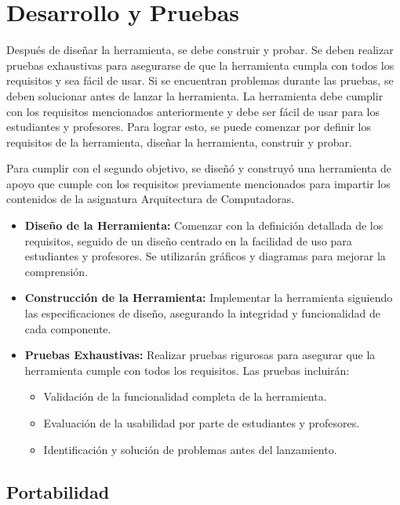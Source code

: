 \documentclass[12pt,twoside]{templates/unerthesis}
\providecommand{\tightlist}{%
  \setlength{\itemsep}{0pt}\setlength{\parskip}{0pt}}
\begin{document}
\hypertarget{desarrollo-y-pruebas}{%
\section{Desarrollo y Pruebas}\label{desarrollo-y-pruebas}}

Después de diseñar la herramienta, se debe construir y probar. Se deben realizar pruebas exhaustivas para asegurarse de que la herramienta cumpla con todos los requisitos y sea fácil de usar. Si se encuentran problemas durante las pruebas, se deben solucionar antes de lanzar la herramienta.
La herramienta debe cumplir con los requisitos mencionados anteriormente y debe ser fácil de usar para los estudiantes y profesores. Para lograr esto, se puede comenzar por definir los requisitos de la herramienta, diseñar la herramienta, construir y probar.

Para cumplir con el segundo objetivo, se diseñó y construyó una herramienta de apoyo que cumple con los requisitos previamente mencionados para impartir los contenidos de la asignatura Arquitectura de Computadoras.

\begin{itemize}
\item
  \textbf{Diseño de la Herramienta:} Comenzar con la definición detallada de los requisitos, seguido de un diseño centrado en la facilidad de uso para estudiantes y profesores. Se utilizarán gráficos y diagramas para mejorar la comprensión.
\item
  \textbf{Construcción de la Herramienta:} Implementar la herramienta siguiendo las especificaciones de diseño, asegurando la integridad y funcionalidad de cada componente.
\item
  \textbf{Pruebas Exhaustivas:} Realizar pruebas rigurosas para asegurar que la herramienta cumple con todos los requisitos. Las pruebas incluirán:

  \begin{itemize}
  \tightlist
  \item
    Validación de la funcionalidad completa de la herramienta.
  \item
    Evaluación de la usabilidad por parte de estudiantes y profesores.
  \item
    Identificación y solución de problemas antes del lanzamiento.
  \end{itemize}
\end{itemize}

\hypertarget{portabilidad}{%
\subsection{Portabilidad}\label{portabilidad}}
\end{document}
